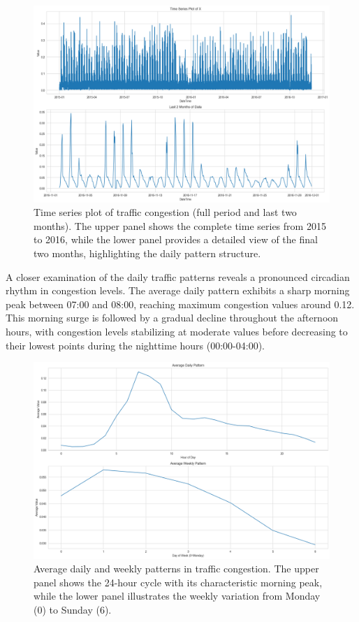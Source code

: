 \documentclass{article}
\begin{document}
\begin{figure}[htbp]
    \centering
    \includegraphics[width=\textwidth]{time_series_full.png}
    \caption{Time series plot of traffic congestion (full period and last two months). The upper panel shows the complete time series from 2015 to 2016, while the lower panel provides a detailed view of the final two months, highlighting the daily pattern structure.}
    \label{fig:time_series}
\end{figure}

A closer examination of the daily traffic patterns reveals a pronounced circadian rhythm in congestion levels. The average daily pattern exhibits a sharp morning peak between 07:00 and 08:00, reaching maximum congestion values around 0.12. This morning surge is followed by a gradual decline throughout the afternoon hours, with congestion levels stabilizing at moderate values before decreasing to their lowest points during the nighttime hours (00:00-04:00).

\begin{figure}[htbp]
    \centering
    \includegraphics[width=\textwidth]{daily_weekly_patterns.png}
    \caption{Average daily and weekly patterns in traffic congestion. The upper panel shows the 24-hour cycle with its characteristic morning peak, while the lower panel illustrates the weekly variation from Monday (0) to Sunday (6).}
    \label{fig:patterns}
\end{figure}
\end{document}
